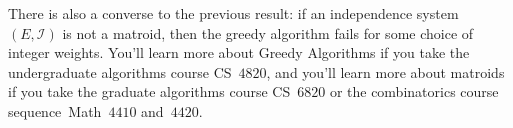 \documentclass[twoside]{article}
\newcommand{\I}{\mathcal{I}}
\begin{document}
There is also a converse to the previous result: if an independence system ${(E, \I)}$ is not a matroid, then the greedy algorithm fails for some choice of integer weights.
You'll learn more about Greedy Algorithms if you take the undergraduate algorithms course CS~$4820$, and you'll learn more about matroids if you take the graduate algorithms course CS~$6820$ or the combinatorics course sequence~Math~$4410$ and~$4420$.
\end{document}
